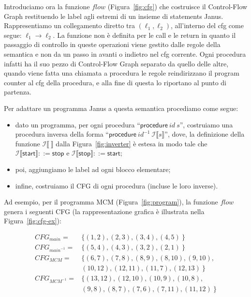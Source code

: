 \documentclass{article}
\theoremstyle{plain}
\theoremstyle{definition}
\theoremstyle{plain}
\newcommand{\ms}[1]{\mathsf{#1}}
\newcommand{\flow}{\mathit{flow}}
\newcommand{\edge}{\longrightarrow}
\begin{document}
Introduciamo ora la funzione $\flow$ (Figura~\ref{fig:cfg}) che costruisce il Control-Flow Graph restituendo le label agli estremi di un insieme di statements Janus. Rappresentiamo un collegamento diretto tra $(\ell_1,\ell_2)$, all'interno del cfg come segue: $\ell_1 \edge \ell_2$. La funzione non è definita per le call e le return in quanto il passaggio di controllo in queste operazioni viene gestito dalle regole della semantica e non da un passo in avanti o indietro nel cfg corrente. Ogni procedura infatti ha il suo pezzo di Control-Flow Graph separato da quello delle altre, quando viene fatta una chiamata a procedura le regole reindirizzano il program counter al cfg della procedura, e alla fine di questa lo riportano al punto di partenza.

\medskip
\noindent Per adattare un programma Janus a questa semantica procediamo come segue:
\begin{itemize}
\item dato un programma, %
per ogni procedura ``$\ms{procedure}~\mathit{id}~s$'',
costruiamo una procedura inversa della forma
``$\ms{procedure}~\mathit{id}^{-1}~\mathcal{I}\llbracket 
s \rrbracket$'', dove, la definizione della funzione
$\mathcal{I}\llbracket ~ \rrbracket$ dalla Figura~\ref{fig:inverter} è estesa in modo tale che
$\mathcal{I}\llbracket \ms{start} \rrbracket  ::=  \ms{stop}$
e $\mathcal{I}\llbracket \ms{stop} \rrbracket  ::=  \ms{start}$;
\item poi, aggiungiamo le label ad ogni blocco elementare;
\item infine, costruiamo il CFG di ogni procedura (incluse le loro inverse).
\end{itemize}
%
Ad esempio, per il programma MCM (Figura~\ref{fig:program}),
la funzione $\mathit{flow}$ genera i seguenti CFG (la rappresentazione grafica è illustrata nella Figura~\ref{fig:cfg-ex}):

\[
\begin{array}{ll}
CFG_{\mathit{main}}  = & \{ (1, 2), (2, 3), (3, 4), (4, 5) ~\}\\[1ex]
CFG_{\mathit{main}^{-1}}  = & \{ (5, 4), (4, 3), (3, 2), (2, 1) ~\}\\[1ex]
CFG_{\mathit{MCM}} = & \{  
(6, 7), (7, 8), (8, 9), (8, 10), (9, 10),
\\ & (10, 12), (12, 11), (11, 7), (12, 13)~\}\\[1ex]
CFG_{\mathit{MCM}^{-1}} = & \{ 
(13, 12), (12, 10), (10, 9), (10, 8),
\\ & (9, 8), (8, 7), (7, 6), (7, 11), (11, 12)~\}
\end{array}
\]
\end{document}
